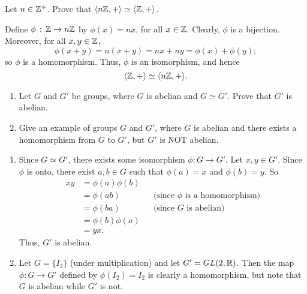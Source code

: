 \begin{exercise}[ID=3C]
Let $n\in \mathbb{Z}^+$. Prove that $\langle n\mathbb{Z},+\rangle \simeq \langle\mathbb{Z},+\rangle$.
\end{exercise}

\begin{solution}[print=true]
Define $\phi\,:\,\mathbb{Z} \rightarrow n\mathbb{Z}$
    by $\phi(x)=nx$, for all $x\in \mathbb{Z}$.  Clearly, $\phi$
    is a bijection. Moreover, for all $x,y\in \mathbb{Z}$,
$$\phi(x+y)=n(x+y)=nx+ny=\phi(x)+\phi(y);$$ so $\phi$ is a
homomorphism.  Thus, $\phi$ is an isomorphism, and hence
$$\langle\mathbb{Z}, +\rangle\simeq \langle n\mathbb{Z}, +\rangle.$$
\end{solution}

\begin{exercise}[ID=3D]

\begin{enumerate}
\item  Let $G$ and $G'$ be groups, where $G$ is abelian and  $G\simeq G'$. Prove that $G'$ is abelian.

\item Give an example of groups $G$ and $G'$, where $G$ is abelian and there exists a homomorphism from $G$ to $G'$, but $G'$ is NOT abelian.
    \end{enumerate}

\end{exercise}

\begin{solution}[print=true]
\begin{enumerate}
\item Since $G\simeq G'$, there exists some isomorphism $\phi:G\to G'$.  Let $x,y\in G'$.  Since $\phi$ is onto, there exist $a,b\in G$ such that $\phi(a)=x$ and $\phi(b)=y$.  So \begin{align*}
    xy&=\phi(a)\phi(b)&&\\
    &=\phi(ab)&&\text{(since $\phi$ is a homomorphism)}\\
    &=\phi(ba) &&\text{(since $G$ is abelian)}\\
    &=\phi(b)\phi(a)\\
    &=yx.\end{align*} Thus, $G'$ is abelian.
\item Let $G=\{I_2\}$ (under multiplication) and let $G'=GL(2,\mathbb{R})$. Then the map $\phi: G\to G'$ defined by $\phi(I_2)=I_2$ is clearly a homomorphism, but note that $G$ is abelian while $G'$ is not.
\end{enumerate}

\end{solution}


